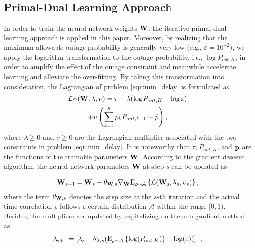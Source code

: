 \documentclass[conference]{IEEEtran}
\begin{document}
\subsection{Primal-Dual Learning Approach}
In order to train the neural network weights ${\bf W}$, the iterative primal-dual learning approach is applied in this paper. Moreover, by realizing that the maximum allowable outage probability is generally very low (e.g., $\varepsilon=10^{-2}$), we apply the logarithm transformation to the outage probability, i.e., $\log {P_{out,K}}$, in order to amplify the effect of the outage constraint and meanwhile accelerate learning and alleviate the over-fitting.
By taking this transformation into consideration, the Lagrangian of problem \eqref{eqn:min_delay} is formulated as
\begin{multline}\label{eqn:dual prrobelm}
\mathcal L_{\Psi}({\bf{W}},\lambda ,\upsilon ) = \tau + \lambda (\log {P_{out,K}} - \log \varepsilon )\\
 + {\upsilon }\left(\sum\limits_{k = 1}^K {{p_k}{P_{out,k-1}}} - \bar p \right),
\end{multline}
where $\lambda  \ge 0$ and $\upsilon  \ge 0$ are the Lagrangian multiplier associated with the two constraints in problem \eqref{eqn:min_delay}. It is noteworthy that $\tau $, ${P_{out,K}}$, and $\bf p$ are the functions of the trainable parameters $\bf W$. According to the gradient descent algorithm, the neural network parameters $\bf W$ at step $s$ can be updated as

\begin{equation}\label{eqn:optweight}
\begin{array}{l}
{{\bf{W}}_{s + 1}} = {{\bf{W}}_s} - {\theta _{{\bf{W}},s}} {\nabla _{\bf{W}}}{{\rm E}_{\rho  \sim \mathcal A}}\left\{\mathcal L({{\bf{W}}_s},{\lambda_s} ,{\upsilon_s})\right\},
\end{array}
\end{equation}
where the term ${\theta _{{\bf{W}},s}}$ denotes the step size at the $s$-th iteration and the actual time correlation $\rho$ follows a certain distribution $\mathcal A$ within the range $[0,1)$. Besides, the multipliers are updated by capitalizing on the sub-gradient method as
\begin{equation}\label{eqn:optstepa}
{\lambda _{s + 1}} = {\left[ {{\lambda _s} + {\theta _{{\lambda },s}}({{\rm E}_{\rho  \sim \mathcal A}}\left\{\log ({P_{out,K}})\right\} - \log (\varepsilon))} \right]_ + },
\end{equation}
\end{document}
